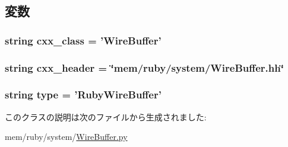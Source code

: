 \subsection{変数}
\hypertarget{classWireBuffer_1_1RubyWireBuffer_a58cd55cd4023648e138237cfc0822ae3}{
\subsubsection[{cxx\_\-class}]{\setlength{\rightskip}{0pt plus 5cm}string {\bf cxx\_\-class} = '{\bf WireBuffer}'}}
\label{classWireBuffer_1_1RubyWireBuffer_a58cd55cd4023648e138237cfc0822ae3}
\hypertarget{classWireBuffer_1_1RubyWireBuffer_a17da7064bc5c518791f0c891eff05fda}{
\subsubsection[{cxx\_\-header}]{\setlength{\rightskip}{0pt plus 5cm}string {\bf cxx\_\-header} = \char`\"{}mem/ruby/system/WireBuffer.hh\char`\"{}}}
\label{classWireBuffer_1_1RubyWireBuffer_a17da7064bc5c518791f0c891eff05fda}
\hypertarget{classWireBuffer_1_1RubyWireBuffer_acce15679d830831b0bbe8ebc2a60b2ca}{
\subsubsection[{type}]{\setlength{\rightskip}{0pt plus 5cm}string {\bf type} = '{\bf RubyWireBuffer}'}}
\label{classWireBuffer_1_1RubyWireBuffer_acce15679d830831b0bbe8ebc2a60b2ca}


このクラスの説明は次のファイルから生成されました:\begin{DoxyCompactItemize}
\item 
mem/ruby/system/\hyperlink{WireBuffer_8py}{WireBuffer.py}\end{DoxyCompactItemize}

